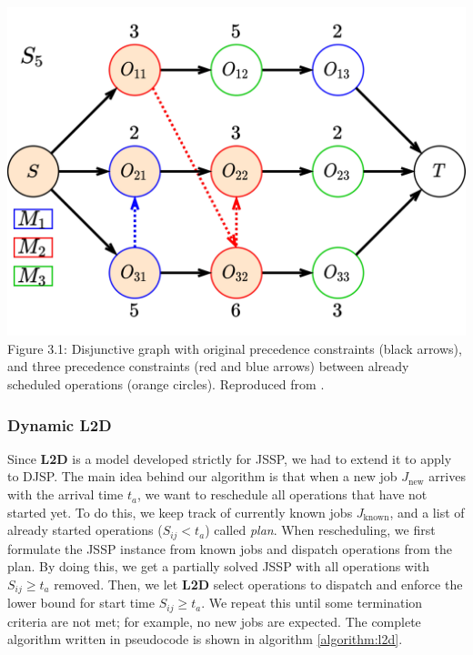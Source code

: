 \begin{center}
    \includegraphics[width=0.75\linewidth]{images/jssp_adding_arcs.pdf}\\
    Figure 3.1: Disjunctive graph with original precedence constraints (black arrows), and three precedence constraints (red and blue arrows) between already scheduled operations (orange circles). Reproduced from \cite{zhang2020learning}.
\end{center}

\subsubsection{Dynamic L2D}

Since \textbf{L2D} is a model developed strictly for JSSP, we had to extend it to apply to DJSP. The main idea behind our algorithm is that when a new job $J_\text{new}$ arrives with the arrival time $t_a$, we want to reschedule all operations that have not started yet. To do this, we keep track of currently known jobs $J_\text{known}$, and a list of already started operations ($S_{ij} < t_a$) called \textit{plan}. When rescheduling, we first formulate the JSSP instance from known jobs and dispatch operations from the plan. By doing this, we get a partially solved JSSP with all operations with $S_{ij} \geq t_a$ removed. Then, we let \textbf{L2D} select operations to dispatch and enforce the lower bound for start time $S_{ij} \geq  t_a$. We repeat this until some termination criteria are not met; for example, no new jobs are expected. The complete algorithm written in pseudocode is shown in algorithm \ref{algorithm:l2d}.

